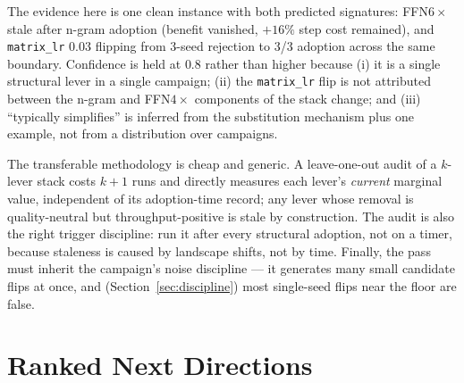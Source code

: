 \documentclass{article}
\begin{document}
The evidence here is one clean instance with both predicted signatures: FFN$6\times$ stale after n-gram adoption (benefit vanished, $+16\%$ step cost remained), and \texttt{matrix\_lr} $0.03$ flipping from 3-seed rejection to 3/3 adoption across the same boundary. Confidence is held at $0.8$ rather than higher because (i) it is a single structural lever in a single campaign; (ii) the \texttt{matrix\_lr} flip is not attributed between the n-gram and FFN$4\times$ components of the stack change; and (iii) ``typically simplifies'' is inferred from the substitution mechanism plus one example, not from a distribution over campaigns.

The transferable methodology is cheap and generic. A leave-one-out audit of a $k$-lever stack costs $k{+}1$ runs and directly measures each lever's \emph{current} marginal value, independent of its adoption-time record; any lever whose removal is quality-neutral but throughput-positive is stale by construction. The audit is also the right trigger discipline: run it after every structural adoption, not on a timer, because staleness is caused by landscape shifts, not by time. Finally, the pass must inherit the campaign's noise discipline --- it generates many small candidate flips at once, and (Section~\ref{sec:discipline}) most single-seed flips near the floor are false.

\section{Ranked Next Directions}
\label{sec:directions}
\end{document}

